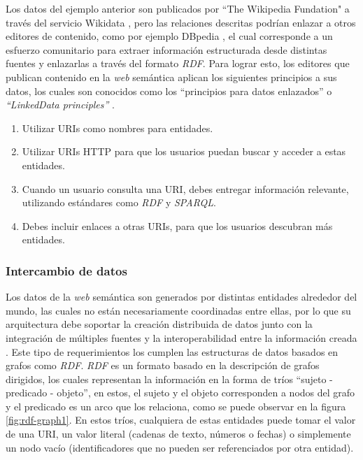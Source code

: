 Los datos del ejemplo anterior son publicados por ``The Wikipedia Fundation" a
través del servicio Wikidata \cite{vrandevcic2014wikidata}, pero las relaciones
descritas podrían enlazar a otros editores de contenido, como por ejemplo
DBpedia \cite{valsecchi2015dbpedia}, el cual corresponde a un esfuerzo comunitario para
extraer información estructurada desde distintas fuentes y enlazarlas a través
del formato \textit{RDF}. Para lograr esto, los editores que publican contenido en la
\textit{web} semántica aplican los siguientes principios a sus datos, los cuales
son conocidos como los ``principios para datos enlazados'' o
\textit{``LinkedData principles''} \cite{bizer2011linked}.

\begin{enumerate}
    \item Utilizar URIs como nombres para entidades.
    \item Utilizar URIs HTTP para que los usuarios puedan buscar y acceder a
    estas entidades.
    \item Cuando un usuario consulta una URI, debes entregar información
    relevante, utilizando estándares como \textit{RDF} y \textit{SPARQL}.
    \item Debes incluir enlaces a otras URIs, para que los usuarios descubran
    más entidades.
\end{enumerate}

\subsubsection{Intercambio de datos}
\label{sec:intercambio-datos}

Los datos de la \textit{web} semántica son generados por distintas entidades
alrededor del mundo, las cuales no están necesariamente coordinadas entre ellas,
por lo que su arquitectura debe soportar la creación distribuida de datos junto
con la integración de múltiples fuentes y la interoperabilidad entre la
información creada \cite{bizer2011linked}. Este tipo de requerimientos los
cumplen las estructuras de datos basados en grafos como \textit{RDF}.
\textit{RDF} es un formato basado en la descripción de grafos dirigidos, los
cuales representan la información en la forma de tríos ``sujeto - predicado -
objeto'', en estos, el sujeto y el objeto corresponden a nodos del grafo
y el predicado es un arco que los relaciona, como se puede observar en la figura
\ref{fig:rdf-graph1}. En estos tríos, cualquiera de estas entidades puede tomar el
valor de una URI, un valor literal (cadenas de texto, números o fechas) o
simplemente un nodo vacío (identificadores que no pueden ser referenciados por
otra entidad).

